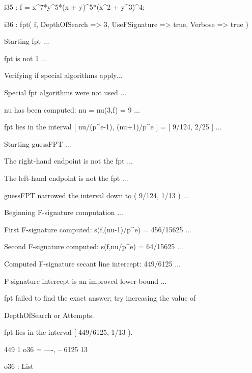 \documentclass{amsart}
\begin{document}
{\small
{}
\begin{MyVerbatim}

i35 : f = x^7*y^5*(x + y)^5*(x^2 + y^3)^4;

i36 : fpt( f, DepthOfSearch => 3, UseFSignature => true, Verbose => true )

Starting fpt ...

fpt is not 1 ...

Verifying if special algorithms apply...

Special fpt algorithms were not used ...

nu has been computed: nu = nu(3,f) = 9 ...

fpt lies in the interval [ nu/(p^e-1), (nu+1)/p^e ] = [ 9/124, 2/25 ] ...

Starting guessFPT ...

The right-hand endpoint is not the fpt ...

The left-hand endpoint is not the fpt ...

guessFPT narrowed the interval down to ( 9/124, 1/13 ) ...

Beginning F-signature computation ...

First F-signature computed: s(f,(nu-1)/p^e) = 456/15625 ...

Second F-signature computed: s(f,nu/p^e) = 64/15625 ...

Computed F-signature secant line intercept: 449/6125 ...

F-signature intercept is an improved lower bound ...

fpt failed to find the exact answer; try increasing the value of

DepthOfSearch or Attempts.

fpt lies in the interval [ 449/6125, 1/13 ).

        449   1
o36 = {----, --}
       6125  13

o36 : List

\end{MyVerbatim}
}

\newpage


\end{document}
